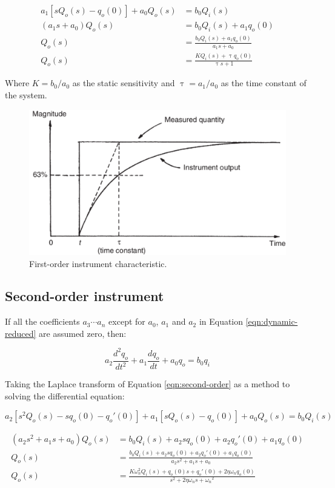 \documentclass[a4paper,11pt]{book}
\begin{document}
\begin{align}
a_1 \left[ s Q_o(s) - q_o(0) \right] + a_0 Q_o(s) &= b_0 Q_i(s) \\ 
( a_1 s + a_0 ) Q_o(s) &= b_0 Q_i(s) + a_1 q_o(0) \\
Q_o(s) &= \frac{ b_0 Q_i(s) + a_1 q_o(0) }{ a_1 s + a_0 } \\
Q_o(s) &= \frac{ K Q_i(s) + \uptau q_o(0) }{ \uptau s + 1} \label{eqn:first-order-laplace}
\end{align}

Where $K = b_0/a_0$ as the static sensitivity and $\uptau = a_1/a_0$ as the time constant of the system.

\begin{figure}[h!]\label{fig:first-order}
\centering
  \includegraphics[width=0.7\linewidth]{first-order}
  \caption{First-order instrument characteristic.} 
\end{figure}

\subsection*{Second-order instrument}

If all the coefficients $a_3 \cdots a_n$ except for $a_0$, $a_1$ and $a_2$ in Equation \ref{eqn:dynamic-reduced} are assumed zero, then: 

\begin{equation}\label{eqn:second-order}
a_2 \frac{d^2q_o}{dt^2} + a_1 \frac{dq_o}{dt} + a_0 q_o = b_0 q_i  
\end{equation}

Taking the Laplace transform of Equation \ref{eqn:second-order} as a method to solving the differential equation:

\begin{equation}
a_2 \left[ s^2 Q_o(s) - s q_o(0) - q_o'(0) \right] + a_1 \left[ sQ_o(s) - q_o(0) \right] + a_0Q_o(s) = b_0 Q_i(s) 
\end{equation}

\begin{align} 
(a_2 s^2 + a_1 s + a_0 ) Q_o(s) &= b_0 Q_i(s) + a_2sq_o(0) + a_2 q_o'(0) + a_1 q_o(0) \\
Q_o(s) &= \frac{ b_0 Q_i(s) + a_2sq_o(0) + a_2 q_o'(0) + a_1 q_o(0) }{ a_2 s^2 + a_1 s + a_0 } \\
Q_o(s) &= \frac{ K \omega_n^2 Q_i(s) + q_o(0)s + q_o'(0) + 2 \eta \omega_n q_o(0) }{ s^2 + 2 \eta \omega_n s + {\omega_n}^2} \label{eqn:second-order-laplace}
\end{align}
\end{document}
